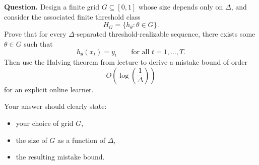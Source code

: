 \documentclass{article}
\begin{document}
\textbf{Question.}
Design a finite grid $G \subseteq [0,1]$ whose size depends only on $\Delta$,
and consider the associated finite threshold class
\[
H_G = \{h_\theta : \theta \in G\}.
\]
Prove that for every $\Delta$-separated threshold-realizable sequence, there
exists some $\theta \in G$ such that
\[
h_\theta(x_t)=y_t
\qquad \text{for all } t=1,\dots,T.
\]
Then use the Halving theorem from lecture to derive a mistake bound of order
\[
O\!\left(\log\left(\frac{1}{\Delta}\right)\right)
\]
for an explicit online learner.

Your answer should clearly state:
\begin{itemize}[leftmargin=2.5em]
    \item your choice of grid $G$,
    \item the size of $G$ as a function of $\Delta$,
    \item the resulting mistake bound.
\end{itemize}
\end{document}
